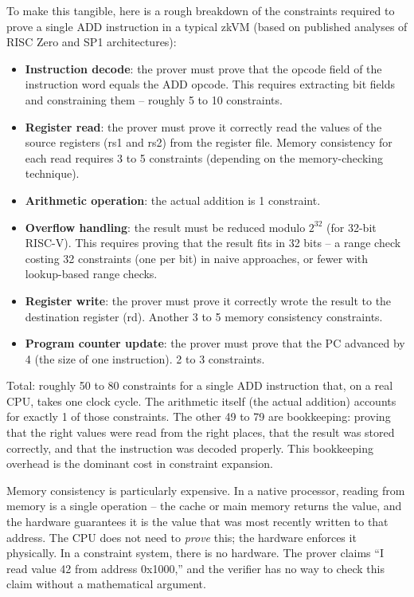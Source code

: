 \documentclass[
  11pt,
  openany]{report}
\providecommand{\tightlist}{%
  \setlength{\itemsep}{0pt}\setlength{\parskip}{0pt}}
\renewcommand{\textbf}[1]{{\bfseries\color{MidnightBold}#1}}
\begin{document}
To make this tangible, here is a rough breakdown of the constraints required to
prove a single ADD instruction in a typical zkVM (based on published analyses of
RISC Zero and SP1 architectures):

\begin{itemize}
\tightlist
\item
  \textbf{Instruction decode}: the prover must prove that the opcode field of
  the instruction word equals the ADD opcode. This requires extracting bit
  fields and constraining them -- roughly 5 to 10 constraints.
\item
  \textbf{Register read}: the prover must prove it correctly read the values of
  the source registers (rs1 and rs2) from the register file. Memory consistency
  for each read requires 3 to 5 constraints (depending on the memory-checking
  technique).
\item
  \textbf{Arithmetic operation}: the actual addition is 1 constraint.
\item
  \textbf{Overflow handling}: the result must be reduced modulo \(2^{32}\) (for
  32-bit RISC-V). This requires proving that the result fits in 32 bits -- a
  range check costing 32 constraints (one per bit) in naive approaches, or fewer
  with lookup-based range checks.
\item
  \textbf{Register write}: the prover must prove it correctly wrote the result
  to the destination register (rd). Another 3 to 5 memory consistency
  constraints.
\item
  \textbf{Program counter update}: the prover must prove that the PC advanced by
  4 (the size of one instruction). 2 to 3 constraints.
\end{itemize}

Total: roughly 50 to 80 constraints for a single ADD instruction that, on a real
CPU, takes one clock cycle. The arithmetic itself (the actual addition) accounts
for exactly 1 of those constraints. The other 49 to 79 are bookkeeping: proving
that the right values were read from the right places, that the result was
stored correctly, and that the instruction was decoded properly. This
bookkeeping overhead is the dominant cost in constraint expansion.

Memory consistency is particularly expensive. In a native processor, reading
from memory is a single operation -- the cache or main memory returns the value,
and the hardware guarantees it is the value that was most recently written to
that address. The CPU does not need to \emph{prove} this; the hardware enforces
it physically. In a constraint system, there is no hardware. The prover claims
``I read value 42 from address 0x1000,'' and the verifier has no way to check
this claim without a mathematical argument.
\end{document}
